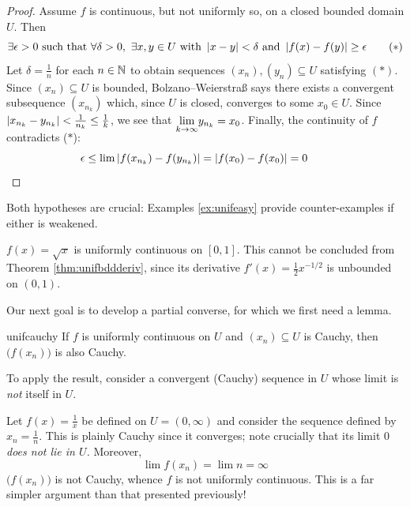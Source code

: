 \begin{proof}
	Assume $f$ is continuous, but not uniformly so, on a closed bounded domain $U$. Then \[\exists\epsilon>0\text{ such that }\forall\delta>0,\ \exists x,y\in U\text{ with }\left| x-y\right|<\delta\text{ and }\left| f(x)-f(y)\right|\ge\epsilon\tag*{$(\ast)$}\]
	Let $\delta=\frac 1n$ for each $n\in\mathbb{N}$ to obtain sequences $(x_n),(y_n)\subseteq U$ satisfying $(\ast)$.\footnotemark{}\smallbreak
	Since $(x_n)\subseteq U$ is bounded, Bolzano--Weierstraß says there exists a convergent subsequence $(x_{n_k})$ which, since $U$ is closed, converges to some $x_0\in U$.\smallbreak
	Since $\left| x_{n_k}-y_{n_k}\right|<\frac 1{n_k}\le\frac 1k$, we see that $\smash[b]{\lim\limits_{k\to\infty}}y_{n_k}=x_0$. Finally, the continuity of $f$ contradicts ($\ast$):
	\[\epsilon\le \lim\left| f(x_{n_k})-f(y_{n_k})\right|=\left| f(x_0)-f(x_0)\right|=0\tag*{\qedhere}\]
\end{proof}


Both hypotheses are crucial: Examples \ref{ex:unifeasy} provide counter-examples if either is weakened.

\begin{example}{}{}
	$f(x)=\sqrt x$ is uniformly continuous on $[0,1]$. This cannot be concluded from Theorem \ref{thm:unifbddderiv}, since its derivative $f'(x)=\frac 12x^{-1/2}$ is unbounded on $(0,1)$.
\end{example}

\smallskip

Our next goal is to develop a partial converse, for which we first need a lemma.


\begin{lemm}{}{unifcauchy}
	If $f$ is uniformly continuous on $U$ and $(x_n)\subseteq U$ is Cauchy, then $\bigl(f(x_n)\bigr)$ is also Cauchy.
\end{lemm}

To apply the result, consider a convergent (Cauchy) sequence in $U$ whose limit is \emph{not} itself in $U$.

\begin{example}{}{}
	Let $f(x)=\frac 1{x}$ be defined on $U=(0,\infty)$ and consider the sequence defined by $x_n=\frac 1n$. This is plainly Cauchy since it converges; note crucially that its limit $0$ \emph{does not lie in $U$.} Moreover,
	\[
		\lim f(x_n)=\lim n=\infty
	\]
	$\bigl(f(x_n)\bigr)$ is not Cauchy, whence $f$ is not uniformly continuous. This is a far simpler argument than that presented previously!
\end{example}

